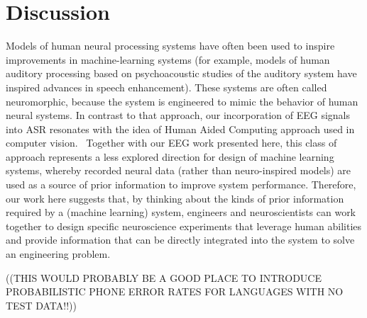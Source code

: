 \section{Discussion}

Models of human neural processing systems have often been used to
inspire improvements in machine-learning systems (for example, models of
human auditory processing based on psychoacoustic studies of the
auditory system have inspired advances in speech enhancement). These
systems are often called neuromorphic, because the system is engineered
to mimic the behavior of human neural systems. In contrast to that
approach, our incorporation of EEG signals into ASR resonates with the
idea of Human Aided Computing approach used in computer
vision.~\cite{Shenoy08,Wang09} Together with our EEG work presented here,
this class of approach represents a less explored direction for design
of machine learning systems, whereby recorded neural data (rather than
neuro-inspired models) are used as a source of prior information to
improve system performance. Therefore, our work here suggests that, by
thinking about the kinds of prior information required by a (machine
learning) system, engineers and neuroscientists can work together to
design specific neuroscience experiments that leverage human abilities
and provide information that can be directly integrated into the system
to solve an engineering problem.

((THIS WOULD PROBABLY BE A GOOD PLACE TO INTRODUCE PROBABILISTIC PHONE ERROR RATES FOR LANGUAGES WITH NO TEST DATA!!))
